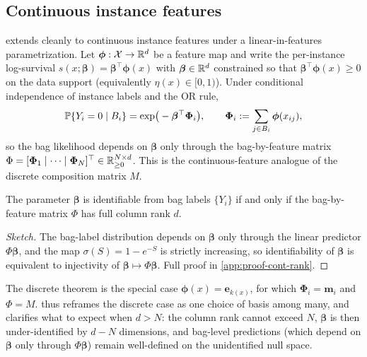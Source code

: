 \subsection{Continuous instance features}
\label{sec:continuous}

 extends cleanly to continuous instance features
under a linear-in-features parametrization. Let $\bm\phi: \mathcal X
\to \mathbb{R}^d$ be a feature map and write the per-instance log-survival
$s(x; \bm\beta) = \bm\beta^\top \bm\phi(x)$ with $\bm\beta \in \mathbb{R}^d$
constrained so that $\bm\beta^\top \bm\phi(x) \geq 0$ on the data
support (equivalently $\eta(x) \in [0, 1)$). Under conditional
independence of instance labels and the OR rule,
\begin{equation}
  \mathbb{P}\{Y_i = 0 \mid B_i\}
   = \exp\!\big(-\bm\beta^\top \bm\Phi_i\big),
   \qquad
   \bm\Phi_i := \sum_{j \in B_i} \bm\phi(x_{ij}),
   \label{eq:trans-cont-lik}
\end{equation}
so the bag likelihood depends on $\bm\beta$ only through the
bag-by-feature matrix
$\Phi = [\bm\Phi_1 \mid \cdots \mid \bm\Phi_N]^\top \in
\mathbb{R}^{N \times d}_{\geq 0}$. This is the continuous-feature analogue
of the discrete composition matrix $M$.

\begin{theorem}
\label{thm:rank-continuous}
The parameter $\bm\beta$ is identifiable from bag labels
$\{Y_i\}$ if and only if the bag-by-feature matrix $\Phi$ has full
column rank $d$.
\end{theorem}

\begin{proof}[Sketch]
The bag-label distribution depends on $\bm\beta$ only through the
linear predictor $\Phi\bm\beta$, and the map $\sigma(S) = 1 - e^{-S}$
is strictly increasing, so identifiability of $\bm\beta$ is
equivalent to injectivity of $\bm\beta \mapsto \Phi\bm\beta$.
Full proof in \cref{app:proof-cont-rank}.
\end{proof}

The discrete theorem is the special case $\bm\phi(x) =
\bm e_{k(x)}$, for which $\bm\Phi_i = \bm m_i$ and $\Phi = M$.
 thus reframes the discrete case as one
choice of basis among many, and clarifies what to expect when
$d > N$: the column rank cannot exceed $N$, $\bm\beta$ is then
under-identified by $d - N$ dimensions, and bag-level predictions
(which depend on $\bm\beta$ only through $\Phi\bm\beta$) remain
well-defined on the unidentified null space.

